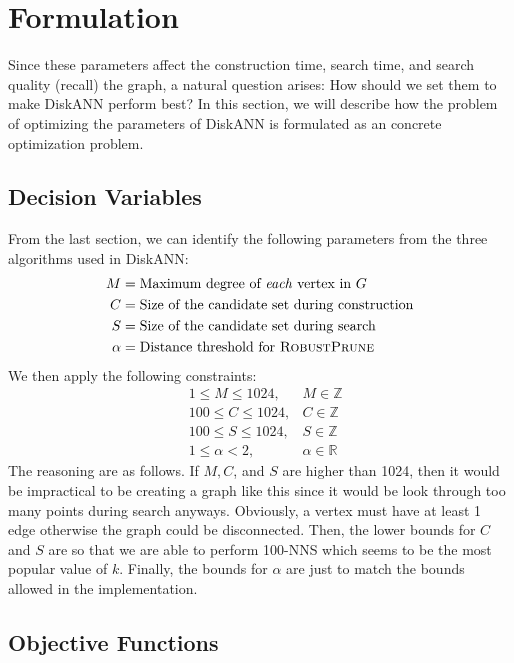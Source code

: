 \section{Formulation}

Since these parameters affect the construction time, search time, and search quality (recall) the graph, a natural question arises: How should we set them to make DiskANN perform best? In this section, we will describe how the problem of optimizing the parameters of DiskANN is formulated as an concrete optimization problem.

\subsection{Decision Variables}

From the last section, we can identify the following parameters from the three algorithms used in DiskANN:
\[
\begin{aligned}
    M &= \text{Maximum degree of \textit{each} vertex in \(G\)} \\
    C &= \text{Size of the candidate set during construction} \\
    S &= \text{Size of the candidate set during search} \\
    \alpha &= \text{Distance threshold for \textsc{RobustPrune}}
\end{aligned}
\]
We then apply the following constraints:
\[
\begin{aligned}
    &1 \leq M \leq 1024, & M \in \mathbb{Z} \\
    &100 \leq C \leq 1024, & C \in \mathbb{Z} \\
    &100 \leq S \leq 1024, & S \in \mathbb{Z} \\
    &1 \leq \alpha < 2, &\alpha \in \mathbb{R}
\end{aligned}
\]
The reasoning are as follows. If \(M, C\), and \(S\) are higher than 1024, then it would be impractical to be creating a graph like this since it would be look through too many points during search anyways. Obviously, a vertex must have at least 1 edge otherwise the graph could be disconnected. Then, the lower bounds for \(C\) and \(S\) are so that we are able to perform 100-NNS which seems to be the most popular value of \(k\). Finally, the bounds for \(\alpha\) are just to match the bounds allowed in the implementation.

\subsection{Objective Functions}

